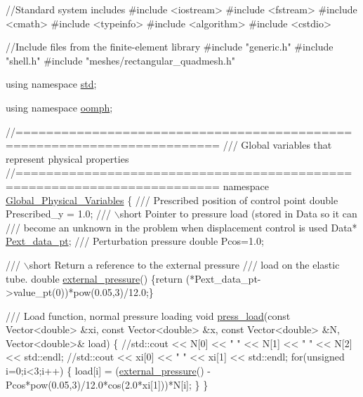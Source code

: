 \begin{DoxyCodeInclude}
\textcolor{comment}{//Standard system includes}
\textcolor{preprocessor}{#include <iostream>}
\textcolor{preprocessor}{#include <fstream>}
\textcolor{preprocessor}{#include <cmath>}
\textcolor{preprocessor}{#include <typeinfo>}
\textcolor{preprocessor}{#include <algorithm>}
\textcolor{preprocessor}{#include <cstdio>}

\textcolor{comment}{//Include files from the finite-element library}
\textcolor{preprocessor}{#include "generic.h"}
\textcolor{preprocessor}{#include "shell.h"}
\textcolor{preprocessor}{#include "meshes/rectangular\_quadmesh.h"}

\textcolor{keyword}{using namespace }\hyperlink{namespacestd}{std};

\textcolor{keyword}{using namespace }\hyperlink{namespaceoomph}{oomph};

\textcolor{comment}{//======================================================================== }\textcolor{comment}{}
\textcolor{comment}{/// Global variables that represent physical properties}
\textcolor{comment}{}\textcolor{comment}{//======================================================================== }
\textcolor{keyword}{namespace }\hyperlink{namespaceGlobal__Physical__Variables}{Global\_Physical\_Variables}
\{
\textcolor{comment}{}
\textcolor{comment}{ /// Prescribed position of control point}
\textcolor{comment}{} \textcolor{keywordtype}{double} Prescribed\_y = 1.0;
\textcolor{comment}{}
\textcolor{comment}{ /// \(\backslash\)short Pointer to pressure load (stored in Data so it can }
\textcolor{comment}{ /// become an unknown in the problem when displacement control is used}
\textcolor{comment}{} Data* \hyperlink{namespaceGlobal__Physical__Variables_ae5107b48f68b31302f3d37b038739904}{Pext\_data\_pt};
\textcolor{comment}{}
\textcolor{comment}{ /// Perturbation pressure}
\textcolor{comment}{} \textcolor{keywordtype}{double} Pcos=1.0;

\textcolor{comment}{}
\textcolor{comment}{ /// \(\backslash\)short Return a reference to the external pressure }
\textcolor{comment}{ /// load on the elastic tube.}
\textcolor{comment}{} \textcolor{keywordtype}{double} \hyperlink{namespaceGlobal__Physical__Variables_a80149b39ce76ea0a779f7493905eb1b8}{external\_pressure}() 
  \{\textcolor{keywordflow}{return} (*Pext\_data\_pt->value\_pt(0))*pow(0.05,3)/12.0;\}

\textcolor{comment}{}
\textcolor{comment}{ /// Load function, normal pressure loading}
\textcolor{comment}{} \textcolor{keywordtype}{void} \hyperlink{namespaceGlobal__Physical__Variables_a86fd8f502cb8c4c7939ffae742f023eb}{press\_load}(\textcolor{keyword}{const} Vector<double> &xi,
                 \textcolor{keyword}{const} Vector<double> &x,
                 \textcolor{keyword}{const} Vector<double> &N,
                 Vector<double>& load)
 \{
  \textcolor{comment}{//std::cout << N[0] << " " << N[1] << " " << N[2] << std::endl;}
  \textcolor{comment}{//std::cout << xi[0] << " " << xi[1] << std::endl;}
  \textcolor{keywordflow}{for}(\textcolor{keywordtype}{unsigned} i=0;i<3;i++) 
   \{
    load[i] = (\hyperlink{namespaceGlobal__Physical__Variables_a80149b39ce76ea0a779f7493905eb1b8}{external\_pressure}() - 
               Pcos*pow(0.05,3)/12.0*cos(2.0*xi[1]))*N[i];
   \}
 \}


\end{DoxyCodeInclude}

